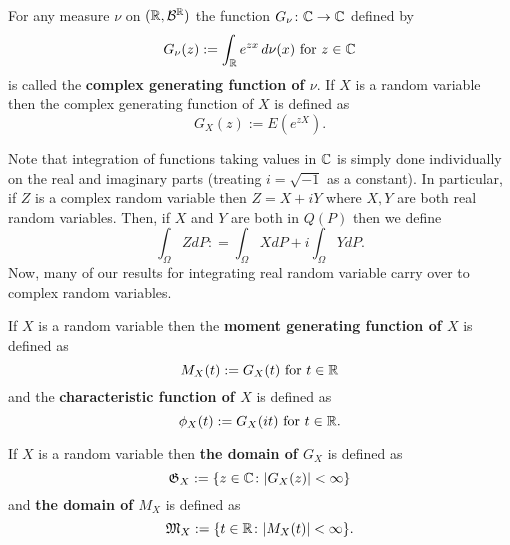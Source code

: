 



\begin{definition}
For any measure $\nu$ on $(\Bbb R,\mathcal B^{\Bbb R})$ the function $G_\nu\colon \Bbb C \rightarrow \Bbb C$ defined by
\[G_\nu(z):= \int_{\Bbb R} e^{zx}\,d\nu(x)\text{ for $z\in\Bbb C$}  \]
is called the {\bf complex generating function of $\nu$}. If $X$ is a random variable then the complex generating function of $X$ is defined as
\[
G_{X}(z):= E(e^{zX}).
\]
\end{definition}


Note that integration of functions taking values in $\Bbb C$ is simply done individually on the real and imaginary parts (treating $i=\sqrt{-1}$ as a constant). In particular, if $Z$ is a complex random variable then $Z= X+iY$ where $X,Y$ are both real random variables. Then, if $X$ and $Y$ are both in $Q(P)$ then we define
\[
\int_\Omega ZdP: = \int_\Omega XdP + i\int_\Omega YdP.
\]
Now, many of our results for integrating real random variable carry over to complex random variables.

\begin{definition}
If $X$ is a random variable then the {\bf moment generating function of $X$} is defined as
\[
M_X(t):= G_X(t)\text{  for $t\in \Bbb R$}
\]
and the {\bf characteristic function of $X$} is defined as
\[
\phi_X(t):= G_X(it)\text{  for $t\in \Bbb R$.}
\]
\end{definition}







\begin{definition}
If $X$ is a random variable then {\bf the domain of $G_X$} is defined as
\[
\mathfrak G_{X}:=\{z\in \Bbb C\colon |G_X(z)|<\infty \}
\]
and {\bf the domain of $M_X$} is defined as
\[
\mathfrak M_{X}:=\{t\in \Bbb R\colon |M_X(t)|<\infty \}.
\]
\end{definition}


